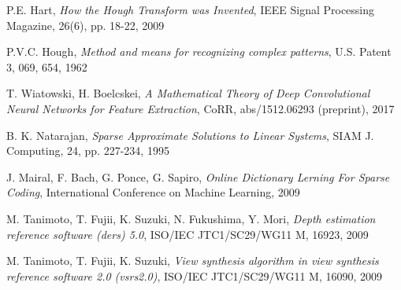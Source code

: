 \documentclass[11pt, english, singlespacing, headsepline, ]{MastersDoctoralThesis}
\theoremstyle{definition}
\begin{document}
\begin{thebibliography}{90}
	P.E. Hart, 
	\emph{How the Hough Transform was Invented},
	IEEE Signal Processing Magazine, 26(6), pp. 18-22,
	2009

	P.V.C. Hough, 
	\emph{Method and means for recognizing complex patterns},
	U.S. Patent 3, 069, 654, 
	1962

	T. Wiatowski, H. Boelcskei,
	\emph{A Mathematical Theory of Deep Convolutional Neural Networks for Feature Extraction},
	CoRR, abs/1512.06293 (preprint), 
	2017

	B. K. Natarajan, 
	\emph{Sparse Approximate Solutions to Linear Systems},
	SIAM J. Computing, 24, pp. 227-234,
	1995

	J. Mairal, F. Bach, G. Ponce, G. Sapiro, 
	\emph{Online Dictionary Lerning For Sparse Coding}, 
	International Conference on Machine Learning,
	2009

	M. Tanimoto, T. Fujii, K. Suzuki, N. Fukushima, Y. Mori,
	\emph{Depth estimation reference software (ders) 5.0},
	ISO/IEC JTC1/SC29/WG11 M, 16923, 
	2009

	M. Tanimoto, T. Fujii, K. Suzuki, 
	\emph{View synthesis algorithm in view synthesis reference software 2.0 (vsrs2.0)}, 
	ISO/IEC JTC1/SC29/WG11 M, 16090,
	2009
	
\end{thebibliography}

\end{document}
